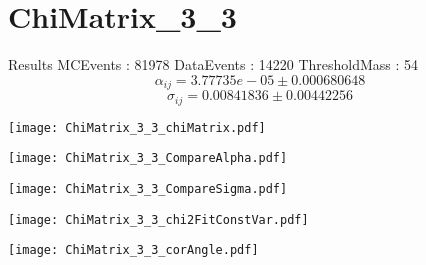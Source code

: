\documentclass[a4paper,12pt]{article}
\begin{document}
\section{ChiMatrix\_3\_3}
\begin{minipage}{0.49\linewidth} Results \newline
MCEvents : 81978\newline
DataEvents : 14220 \newline
ThresholdMass : 54\\
$$\alpha_{ij} = 3.77735e-05\pm 0.000680648$$
$$\sigma_{ij} = 0.00841836\pm 0.00442256$$
\end{minipage}\hfill
\begin{minipage}{0.49\linewidth} 
\texttt{[image: ChiMatrix\_3\_3\_chiMatrix.pdf]}\\
\end{minipage}
\hfill
\begin{minipage}{0.49\linewidth} 
\texttt{[image: ChiMatrix\_3\_3\_CompareAlpha.pdf]}\\
\end{minipage}
\hfill
\begin{minipage}{0.49\linewidth} 
\texttt{[image: ChiMatrix\_3\_3\_CompareSigma.pdf]}\\
\end{minipage}
\begin{minipage}{0.49\linewidth} 
\texttt{[image: ChiMatrix\_3\_3\_chi2FitConstVar.pdf]}\\
\end{minipage}
\hfill
\begin{minipage}{0.49\linewidth} 
\texttt{[image: ChiMatrix\_3\_3\_corAngle.pdf]}\\
\end{minipage}
\end{document}
